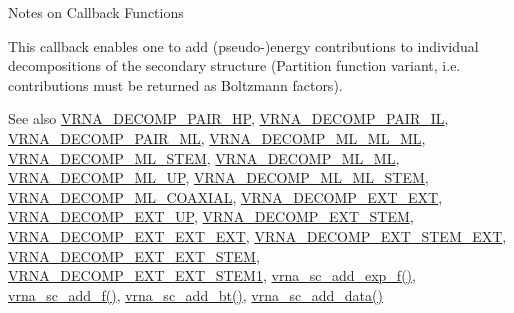 \begin{DoxyRefDesc}{Notes on Callback Functions}
\item[\mbox{\hyperlink{callbacks__callbacks000003}{Notes on Callback Functions}}]This callback enables one to add (pseudo-\/)energy contributions to individual decompositions of the secondary structure (Partition function variant, i.\+e. contributions must be returned as Boltzmann factors). \end{DoxyRefDesc}


\begin{DoxySeeAlso}{See also}
\mbox{\hyperlink{group__constraints_ga8bd41ebc8039378d242e4e8c273716a5}{V\+R\+N\+A\+\_\+\+D\+E\+C\+O\+M\+P\+\_\+\+P\+A\+I\+R\+\_\+\+HP}}, \mbox{\hyperlink{group__constraints_gaeab04f34d7730cff2d651d782f95d857}{V\+R\+N\+A\+\_\+\+D\+E\+C\+O\+M\+P\+\_\+\+P\+A\+I\+R\+\_\+\+IL}}, \mbox{\hyperlink{group__constraints_gaa15b1185673f0b9e900c4748d45f388f}{V\+R\+N\+A\+\_\+\+D\+E\+C\+O\+M\+P\+\_\+\+P\+A\+I\+R\+\_\+\+ML}}, \mbox{\hyperlink{group__constraints_ga735517266f2e35e1374b8f1ea77ef23e}{V\+R\+N\+A\+\_\+\+D\+E\+C\+O\+M\+P\+\_\+\+M\+L\+\_\+\+M\+L\+\_\+\+ML}}, \mbox{\hyperlink{group__constraints_ga4a23054c75d8efc785de50e3ea87602f}{V\+R\+N\+A\+\_\+\+D\+E\+C\+O\+M\+P\+\_\+\+M\+L\+\_\+\+S\+T\+EM}}, \mbox{\hyperlink{group__constraints_ga7f4cb9ff7a33e67f0539bd39e7b19a78}{V\+R\+N\+A\+\_\+\+D\+E\+C\+O\+M\+P\+\_\+\+M\+L\+\_\+\+ML}}, \mbox{\hyperlink{group__constraints_gae6478dda14e50e2f2cb9ef333a29256e}{V\+R\+N\+A\+\_\+\+D\+E\+C\+O\+M\+P\+\_\+\+M\+L\+\_\+\+UP}}, \mbox{\hyperlink{group__constraints_ga63d8ceb8c96ae3b463e529e28cc0fe98}{V\+R\+N\+A\+\_\+\+D\+E\+C\+O\+M\+P\+\_\+\+M\+L\+\_\+\+M\+L\+\_\+\+S\+T\+EM}}, \mbox{\hyperlink{group__constraints_ga4fe48d575830b16c208e280e01ab1497}{V\+R\+N\+A\+\_\+\+D\+E\+C\+O\+M\+P\+\_\+\+M\+L\+\_\+\+C\+O\+A\+X\+I\+AL}}, \mbox{\hyperlink{group__constraints_ga437adf5115c1999304eff26b41e4c9b6}{V\+R\+N\+A\+\_\+\+D\+E\+C\+O\+M\+P\+\_\+\+E\+X\+T\+\_\+\+E\+XT}}, \mbox{\hyperlink{group__constraints_gaff1ddaffe86d984623910b40cc8a8717}{V\+R\+N\+A\+\_\+\+D\+E\+C\+O\+M\+P\+\_\+\+E\+X\+T\+\_\+\+UP}}, \mbox{\hyperlink{group__constraints_gae44b5ace0d9b4a29088069ecb4cec441}{V\+R\+N\+A\+\_\+\+D\+E\+C\+O\+M\+P\+\_\+\+E\+X\+T\+\_\+\+S\+T\+EM}}, \mbox{\hyperlink{group__constraints_ga803bd818b3f4b2b0a4a5cfa2f7dc2045}{V\+R\+N\+A\+\_\+\+D\+E\+C\+O\+M\+P\+\_\+\+E\+X\+T\+\_\+\+E\+X\+T\+\_\+\+E\+XT}}, \mbox{\hyperlink{group__constraints_gabb09c5b78b75a44502fc77b950125c1e}{V\+R\+N\+A\+\_\+\+D\+E\+C\+O\+M\+P\+\_\+\+E\+X\+T\+\_\+\+S\+T\+E\+M\+\_\+\+E\+XT}}, \mbox{\hyperlink{group__constraints_ga06efd054c9271438f6d82d4559d9e69f}{V\+R\+N\+A\+\_\+\+D\+E\+C\+O\+M\+P\+\_\+\+E\+X\+T\+\_\+\+E\+X\+T\+\_\+\+S\+T\+EM}}, \mbox{\hyperlink{group__constraints_ga2e75d7a77118735b32f25422d9686719}{V\+R\+N\+A\+\_\+\+D\+E\+C\+O\+M\+P\+\_\+\+E\+X\+T\+\_\+\+E\+X\+T\+\_\+\+S\+T\+E\+M1}}, \mbox{\hyperlink{group__soft__constraints_ga87e382b5d0c9b7d9ce1b79c0473ff700}{vrna\+\_\+sc\+\_\+add\+\_\+exp\+\_\+f()}}, \mbox{\hyperlink{group__soft__constraints_ga8c7d907ec0125cd61c04e0908010a4e9}{vrna\+\_\+sc\+\_\+add\+\_\+f()}}, \mbox{\hyperlink{group__soft__constraints_gabde7d07a79bb9a8f4721aee247b674ea}{vrna\+\_\+sc\+\_\+add\+\_\+bt()}}, \mbox{\hyperlink{group__soft__constraints_ga15c6d52471ec97897e2bb7f964f5deb6}{vrna\+\_\+sc\+\_\+add\+\_\+data()}}

\end{DoxySeeAlso}
